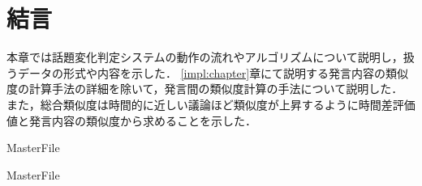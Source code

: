 \section{結言}
\label{model:conclusion}
本章では話題変化判定システムの動作の流れやアルゴリズムについて説明し，扱うデータの形式や内容を示した．
\ref{impl:chapter}章にて説明する発言内容の類似度の計算手法の詳細を除いて，発言間の類似度計算の手法について説明した．
また，総合類似度は時間的に近しい議論ほど類似度が上昇するように時間差評価値と発言内容の類似度から求めることを示した．

 \expandafter\ifx\csname MasterFile\endcsname\relax
	\def\BibFile{hoge}
	
  \fi
  \expandafter\ifx\csname MasterFile\endcsname\relax
  
  \fi
